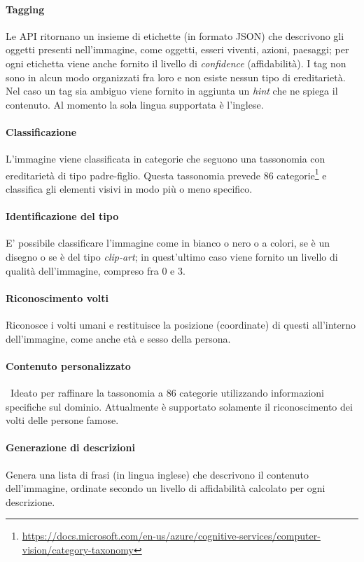 \paragraph{Tagging} Le API ritornano un insieme di etichette (in formato JSON) che descrivono gli oggetti presenti nell'immagine, come oggetti, esseri viventi, azioni, paesaggi; per ogni etichetta viene anche fornito il livello di \textit{confidence} (affidabilità). I tag non sono in alcun modo organizzati fra loro e non esiste nessun tipo di ereditarietà.
Nel caso un tag sia ambiguo viene fornito in aggiunta un \textit{hint} che ne spiega il contenuto.
Al momento la sola lingua supportata è l'inglese.

\paragraph{Classificazione} L'immagine viene classificata in categorie che seguono una tassonomia con ereditarietà di tipo padre-figlio. Questa tassonomia prevede 86 categorie\footnote{\url{https://docs.microsoft.com/en-us/azure/cognitive-services/computer-vision/category-taxonomy}} e classifica gli elementi visivi in modo più o meno specifico.

\paragraph{Identificazione del tipo} E' possibile classificare l'immagine come in bianco o nero o a colori, se è un disegno o se è del tipo \textit{clip-art}; in quest'ultimo caso viene fornito un livello di qualità dell'immagine, compreso fra 0 e 3.

\paragraph{Riconoscimento volti} Riconosce i volti umani e restituisce la posizione (coordinate) di questi all'interno dell'immagine, come anche età e sesso della persona.

\paragraph{Contenuto personalizzato} Ideato per raffinare la tassonomia a 86 categorie utilizzando informazioni specifiche sul dominio. Attualmente è supportato solamente il riconoscimento dei volti delle persone famose.

\paragraph{Generazione di descrizioni} Genera una lista di frasi (in lingua inglese) che descrivono il contenuto dell'immagine, ordinate secondo un livello di affidabilità calcolato per ogni descrizione.

